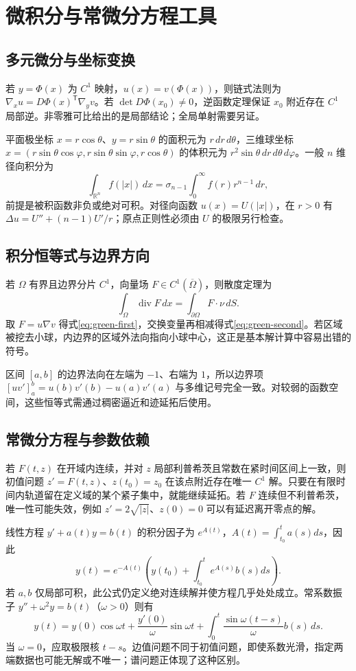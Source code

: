 \setcounter{chapter}{0} %
\chapter{微积分与常微分方程工具}
\label{app:calculus}

\section{多元微分与坐标变换}
若 $y=\Phi(x)$ 为 $C^1$ 映射，$u(x)=v(\Phi(x))$，则链式法则为 $\nabla_xu=D\Phi(x)^{\mathsf T}\nabla_yv$。若 $\det D\Phi(x_0)\ne0$，逆函数定理保证 $x_0$ 附近存在 $C^1$ 局部逆。非零雅可比给出的是局部结论；全局单射需要另证。

平面极坐标 $x=r\cos\theta$、$y=r\sin\theta$ 的面积元为 $r\,dr\,d\theta$，三维球坐标 $x=(r\sin\theta\cos\varphi,r\sin\theta\sin\varphi,r\cos\theta)$ 的体积元为 $r^2\sin\theta\,dr\,d\theta\,d\varphi$。一般 $n$ 维径向积分为
\[
 \int_{\mathbb R^n}f(|x|)\,dx=\sigma_{n-1}\int_0^\infty f(r)r^{n-1}\,dr,
\]
前提是被积函数非负或绝对可积。对径向函数 $u(x)=U(|x|)$，在 $r>0$ 有 $\Delta u=U''+(n-1)U'/r$；原点正则性必须由 $U$ 的极限另行检查。

\section{积分恒等式与边界方向}
若 $\Omega$ 有界且边界分片 $C^1$，向量场 $F\in C^1(\overline\Omega)$，则散度定理为
\[
 \int_\Omega\operatorname{div}F\,dx=\int_{\partial\Omega}F\cdot\nu\,dS.
\]
取 $F=u\nabla v$ 得式\eqref{eq:green-first}，交换变量再相减得式\eqref{eq:green-second}。若区域被挖去小球，内边界的区域外法向指向小球中心，这正是基本解计算中容易出错的符号。

区间 $[a,b]$ 的边界法向在左端为 $-1$、右端为 $1$，所以边界项 $[uv']_a^b=u(b)v'(b)-u(a)v'(a)$ 与多维记号完全一致。对较弱的函数空间，这些恒等式需通过稠密逼近和迹延拓后使用。

\section{常微分方程与参数依赖}
若 $F(t,z)$ 在开域内连续，并对 $z$ 局部利普希茨且常数在紧时间区间上一致，则初值问题 $z'=F(t,z)$、$z(t_0)=z_0$ 在该点附近存在唯一 $C^1$ 解。只要在有限时间内轨道留在定义域的某个紧子集中，就能继续延拓。若 $F$ 连续但不利普希茨，唯一性可能失效，例如 $z'=2\sqrt{|z|}$、$z(0)=0$ 可以有延迟离开零点的解。

线性方程 $y'+a(t)y=b(t)$ 的积分因子为 $e^{A(t)}$，$A(t)=\int_{t_0}^t a(s)ds$，因此
\[
 y(t)=e^{-A(t)}\left(y(t_0)+\int_{t_0}^t e^{A(s)}b(s)ds\right).
\]
若 $a,b$ 仅局部可积，此公式仍定义绝对连续解并使方程几乎处处成立。常系数振子 $y''+\omega^2y=b(t)$（$\omega>0$）则有
\[
 y(t)=y(0)\cos\omega t+\frac{y'(0)}\omega\sin\omega t
       +\int_0^t\frac{\sin\omega(t-s)}\omega b(s)\,ds.
\]
当 $\omega=0$，应取极限核 $t-s$。边值问题不同于初值问题，即使系数光滑，指定两端数据也可能无解或不唯一；谱问题正体现了这种区别。

